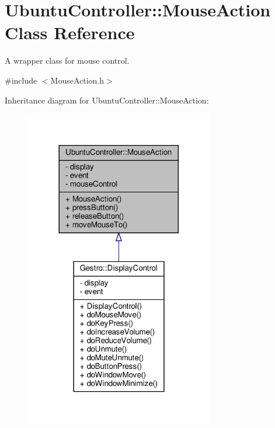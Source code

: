 \hypertarget{class_ubuntu_controller_1_1_mouse_action}{}\section{Ubuntu\+Controller\+:\+:Mouse\+Action Class Reference}
\label{class_ubuntu_controller_1_1_mouse_action}


A wrapper class for mouse control.  




{\ttfamily \#include $<$Mouse\+Action.\+h$>$}



Inheritance diagram for Ubuntu\+Controller\+:\+:Mouse\+Action\+:
\nopagebreak
\begin{figure}[H]
\begin{center}
\leavevmode
\includegraphics[width=233pt]{class_ubuntu_controller_1_1_mouse_action__inherit__graph}
\end{center}
\end{figure}


